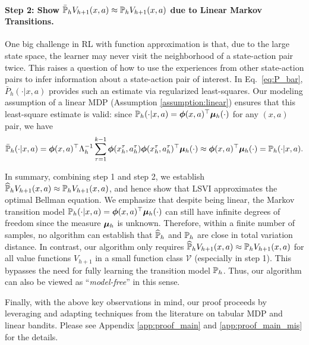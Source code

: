 \paragraph{Step 2: Show $\bar{\P}_h V_{h+1}(x, a) \approx \P_h V_{h+1}(x, a)$ due to Linear Markov Transitions.} One big challenge in RL with function approximation is that, due to the large state space, the learner may never visit the neighborhood of a state-action pair twice. This raises a question of how to use the experiences from other state-action pairs to infer information about a state-action pair of interest. In Eq.~\eqref{eq:P_bar}, $\bar{P}_h(\cdot|x, a)$ provides such an estimate via regularized least-squares. Our modeling assumption of a linear MDP (Assumption \ref{assumption:linear}) ensures that this least-square estimate is valid: since $\P_h(\cdot|x, a)=\bphi(x, a)\trans\bmu_h(\cdot)$ for any $(x, a)$ pair, we have
\begin{equation*}
\bar{\P}_h (\cdot | x, a) = \bphi(x, a)\trans\Lambda_h^{-1} \sum_{\tau=1}^{k-1} \bphi(x^{\tau}_h,  a^{\tau}_h)\bphi(x^{\tau}_h,  a^{\tau}_h)\trans\bmu_h(\cdot)
\approx \bphi(x, a)\trans\bmu_h(\cdot) = \P_h (\cdot | x, a).
\end{equation*}

In summary, combining step 1 and step 2, we establish $\hat{\P}_h V_{h+1}(x, a) \approx \P_h V_{h+1}(x, a)$, and hence show that LSVI approximates the optimal Bellman equation. We emphasize that despite being linear, the Markov transition model $\P_h(\cdot|x, a) = \bphi(x, a)\trans \bmu_h(\cdot)$ can still have infinite degrees of freedom since the measure $\bmu_h$ is unknown. Therefore, within a finite number of samples, no algorithm can establish that $\hat{\P}_h$ and $\P_h$ are close in total variation distance. In contrast, our algorithm only requires $\hat{\P}_h V_{h+1}(x, a) \approx \P_h V_{h+1}(x, a)$ for all value functions $V_{h+1}$ in a small function class $\mathcal{V}$ (especially in step 1). This bypasses the need for fully learning the transition model $\P_h$. Thus, our algorithm can also be viewed as ``\emph{model-free}'' in this sense.  

Finally, with the above key observations in mind, our proof proceeds by leveraging and adapting techniques from the literature on tabular MDP and linear bandits. Please see Appendix \ref{app:proof_main} and \ref{app:proof_main_mis} for the details.




